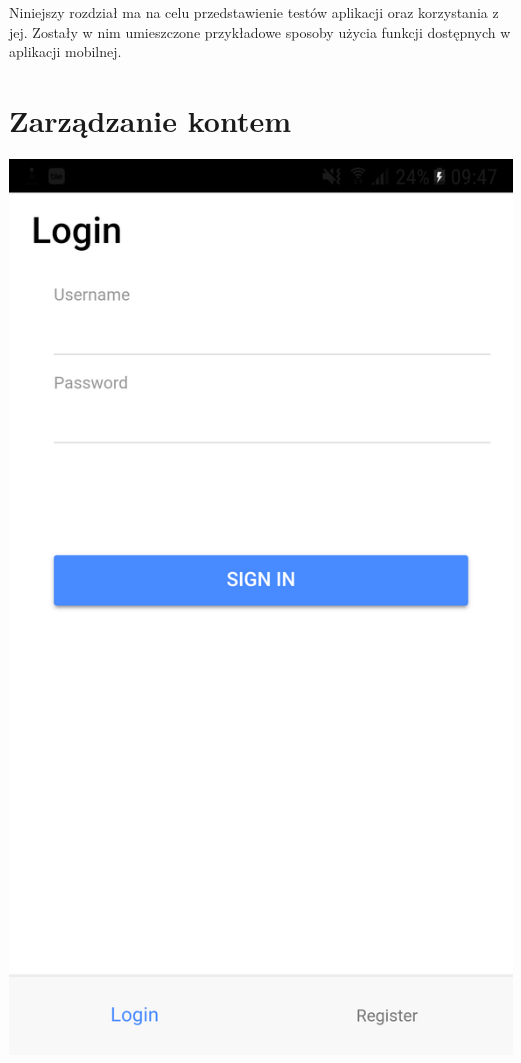Niniejszy rozdział ma na celu przedstawienie testów aplikacji oraz korzystania z jej. Zostały w nim umieszczone przykładowe sposoby użycia funkcji dostępnych w aplikacji mobilnej.



\section{Zarządzanie kontem}

\noindent\begin{minipage}{0.4\textwidth}\raggedleft
	\includegraphics[width=\linewidth]{"images/login_page"}
\end{minipage}

